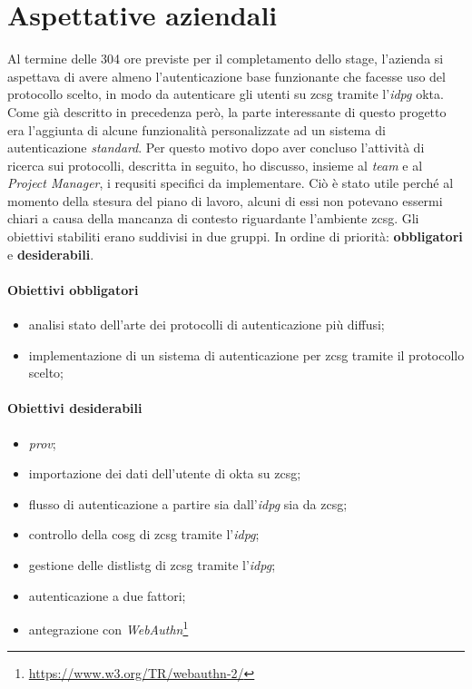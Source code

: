 \section{Aspettative aziendali}\label{sec:aspettative_aziendali}
    Al termine delle 304 ore previste per il completamento dello stage, l'azienda si aspettava di avere almeno l'autenticazione base funzionante che facesse uso del protocollo scelto, in modo da autenticare gli utenti su \gls{zcsg} tramite l'\textit{\gls{idpg}} \gls{okta}. Come già descritto in precedenza però, la parte interessante di questo progetto era l'aggiunta di alcune funzionalità personalizzate ad un sistema di autenticazione \textit{standard}. Per questo motivo dopo aver concluso l'attività di ricerca sui protocolli, descritta in seguito, ho discusso, insieme al \textit{team} e al \textit{Project Manager}, i requsiti specifici da implementare. Ciò è stato utile perché al momento della stesura del piano di lavoro, alcuni di essi non potevano essermi chiari a causa della mancanza di contesto riguardante l'ambiente \gls{zcsg}. Gli obiettivi stabiliti erano suddivisi in due gruppi. In ordine di priorità: \textbf{obbligatori} e \textbf{desiderabili}.
    \paragraph{Obiettivi obbligatori}
    \begin{itemize}
        \item analisi stato dell'arte dei protocolli di autenticazione più diffusi;
        \item implementazione di un sistema di autenticazione per \gls{zcsg} tramite il protocollo scelto;
    \end{itemize}
    \paragraph{Obiettivi desiderabili}
    \begin{itemize}
        \item \textit{\gls{prov}};
        \item importazione dei dati dell'utente di \gls{okta} su \gls{zcsg};
        \item flusso di autenticazione a partire sia dall'\textit{\gls{idpg}} sia da \gls{zcsg};
        \item controllo della \gls{cosg} di \gls{zcsg} tramite l'\textit{\gls{idpg}};
        \item gestione delle \gls{distlistg} di \gls{zcsg} tramite l'\textit{\gls{idpg}};
        \item autenticazione a due fattori;
        \item antegrazione con \textit{WebAuthn}\footnote{\url{https://www.w3.org/TR/webauthn-2/}}
    \end{itemize}

